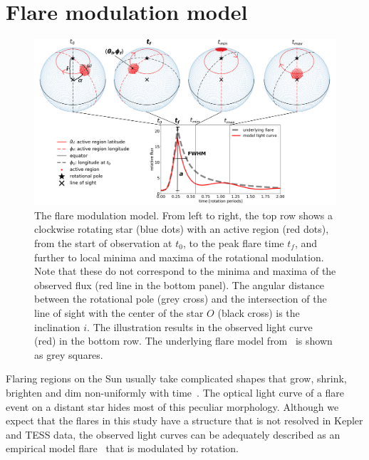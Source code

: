 \documentclass[fleqn,usenatbib,letters]{mnras}%
\begin{document}
\section{Flare modulation model}
\label{sec:model}
\begin{figure}
	\includegraphics[width=17cm]{figures/model_illustration_annot2.png}
    \caption{The flare modulation model. From left to right, the top row shows a clockwise rotating star (blue dots) with an active region (red dots), from the start of observation at $t_0$, to the peak flare time $t_f$, and further to local minima and maxima of the rotational modulation. Note that these do not correspond to the minima and maxima of the observed flux (red line in the bottom panel). The angular distance between the rotational pole (grey cross) and the intersection of the line of sight with the center of the star $O$ (black cross) is the inclination $i$. The illustration results in the observed light curve (red) in the bottom row. The underlying flare model from~\citet{davenport2014} is shown as grey squares.}
    \label{fig:model}
\end{figure}
Flaring regions on the Sun usually take complicated shapes that grow, shrink, brighten and dim non-uniformly with time~\citep{aschwanden2008}. The optical light curve of a flare event on a distant star hides most of this peculiar morphology. Although we expect that the flares in this study have a structure that is not resolved in Kepler and TESS data, the observed light curves can be adequately described as an empirical model flare~\citep{davenport2014} that is modulated by rotation.
\end{document}
